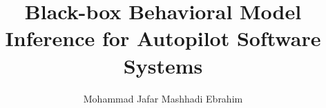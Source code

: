 \author{Mohammad Jafar Mashhadi Ebrahim}
\title{Black-box Behavioral Model Inference for Autopilot Software Systems}




\makethesistitle
